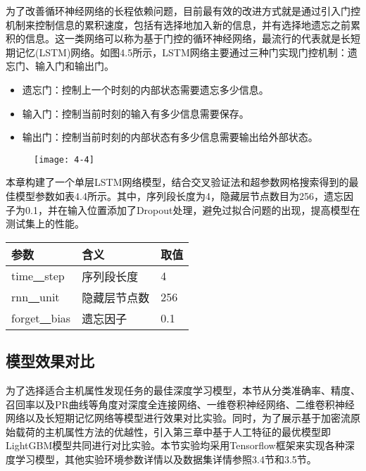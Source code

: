 为了改善循环神经网络的长程依赖问题，目前最有效的改进方式就是通过引入门控机制来控制信息的累积速度，包括有选择地加入新的信息，并有选择地遗忘之前累积的信息。这一类网络可以称为基于门控的循环神经网络，最流行的代表就是长短期记忆(LSTM)网络。如图4.5所示，LSTM网络主要通过三种门实现门控机制：遗忘门、输入门和输出门。

\begin{itemize}
\item 遗忘门：控制上一个时刻的内部状态需要遗忘多少信息。
\item 输入门：控制当前时刻的输入有多少信息需要保存。
\item 输出门：控制当前时刻的内部状态有多少信息需要输出给外部状态。 
\end{itemize}

\begin{figure}[!htbp]
    \centering
    \texttt{[image: 4-4]}
    \label{fig:4-4}
\end{figure}

本章构建了一个单层LSTM网络模型，结合交叉验证法和超参数网格搜索得到的最佳模型参数如表4.4所示。其中，序列段长度为4，隐藏层节点数目为256，遗忘因子为0.1，并在输入位置添加了Dropout处理，避免过拟合问题的出现，提高模型在测试集上的性能。

\begin{table}[!htbp] 
    \centering
    \footnotesize
    \setlength{\tabcolsep}{25pt}
    \renewcommand{\arraystretch}{1}
\begin{tabular}{lll}
\toprule
参数 & 含义 & 取值 \\ \hline
time\underline{~~}step & 序列段长度 & 4 \\ 
rnn\underline{~~}unit & 隐藏层节点数 & 256 \\ 
forget\underline{~~}bias & 遗忘因子 & 0.1 \\ 
\bottomrule
\end{tabular}
\end{table}

\subsection{模型效果对比}

为了选择适合主机属性发现任务的最佳深度学习模型，本节从分类准确率、精度、召回率以及PR曲线等角度对深度全连接网络、一维卷积神经网络、二维卷积神经网络以及长短期记忆网络等模型进行效果对比实验。同时，为了展示基于加密流原始载荷的主机属性方法的优越性，引入第三章中基于人工特征的最优模型即LightGBM模型共同进行对比实验。本节实验均采用Tensorflow框架来实现各种深度学习模型，其他实验环境参数详情以及数据集详情参照3.4节和3.5节。

